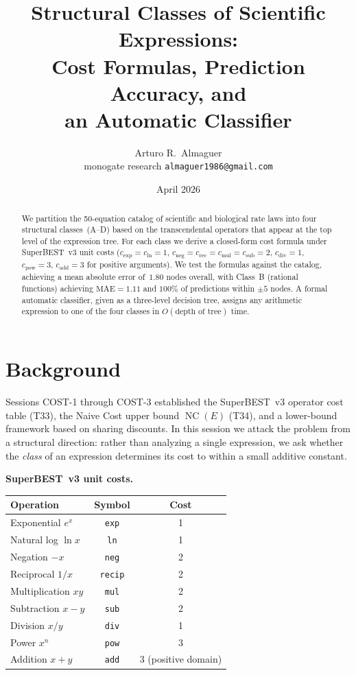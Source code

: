 \documentclass[12pt,a4paper]{article}
\title{Structural Classes of Scientific Expressions:\\
       Cost Formulas, Prediction Accuracy, and\\
       an Automatic Classifier}
\author{Arturo R.\ Almaguer\\
\small monogate research \quad \texttt{almaguer1986@gmail.com}}
\date{April 2026}
\theoremstyle{definition}
\newcommand{\NC}{\operatorname{NC}}
\newcommand{\cexp}{c_{\mathrm{exp}}}
\newcommand{\cln}{c_{\mathrm{ln}}}
\newcommand{\cmul}{c_{\mathrm{mul}}}
\newcommand{\cdiv}{c_{\mathrm{div}}}
\newcommand{\cadd}{c_{\mathrm{add}}}
\newcommand{\csub}{c_{\mathrm{sub}}}
\newcommand{\cpow}{c_{\mathrm{pow}}}
\newcommand{\cneg}{c_{\mathrm{neg}}}
\newcommand{\crec}{c_{\mathrm{rec}}}
\begin{document}
\maketitle

\begin{abstract}
We partition the 50-equation catalog of scientific and biological rate laws into
four structural classes~(A--D) based on the transcendental operators that appear
at the top level of the expression tree.
For each class we derive a closed-form cost formula under SuperBEST~v3 unit
costs ($\cexp=\cln=1$, $\cneg=\crec=\cmul=\csub=2$, $\cdiv=1$, $\cpow=3$,
$\cadd=3$ for positive arguments).
We test the formulas against the catalog, achieving a mean absolute error
of~$1.80$ nodes overall, with Class~B (rational functions) achieving $\mathrm{MAE}=1.11$
and $100\%$ of predictions within $\pm 5$ nodes.
A formal automatic classifier, given as a three-level decision tree, assigns
any arithmetic expression to one of the four classes in $O(\text{depth of tree})$
time.
\end{abstract}

\tableofcontents
\bigskip

\section{Background}
\label{sec:background}

Sessions COST-1 through COST-3 established the SuperBEST~v3 operator cost
table (T33), the Naive Cost upper bound $\NC(E)$ (T34), and a lower-bound
framework based on sharing discounts.
In this session we attack the problem from a structural direction: rather than
analyzing a single expression, we ask whether the \emph{class} of an expression
determines its cost to within a small additive constant.

\medskip
\noindent\textbf{SuperBEST~v3 unit costs.}
\begin{center}
\begin{tabular}{@{}lcc@{}}
\toprule
\textbf{Operation} & \textbf{Symbol} & \textbf{Cost} \\
\midrule
Exponential $e^x$   & \texttt{exp}   & 1 \\
Natural log $\ln x$ & \texttt{ln}    & 1 \\
Negation    $-x$    & \texttt{neg}   & 2 \\
Reciprocal  $1/x$   & \texttt{recip} & 2 \\
Multiplication $xy$ & \texttt{mul}   & 2 \\
Subtraction $x-y$   & \texttt{sub}   & 2 \\
Division    $x/y$   & \texttt{div}   & 1 \\
Power       $x^n$   & \texttt{pow}   & 3 \\
Addition    $x+y$   & \texttt{add}   & 3 (positive domain) \\
\bottomrule
\end{tabular}
\end{center}
\end{document}
